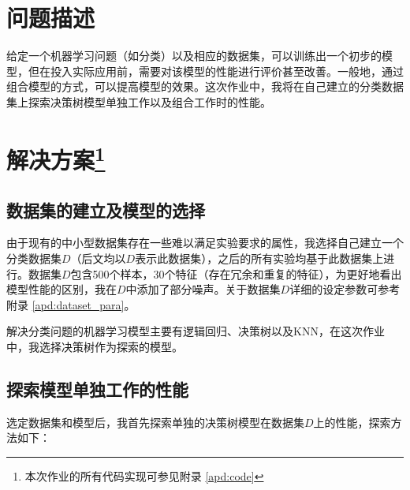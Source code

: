 \documentclass[12pt,a4paper]{article}
\theoremstyle{definition}
\begin{document}
\noindent
\noindent{}

\section{问题描述}

给定一个机器学习问题（如分类）以及相应的数据集，可以训练出一个初步的模型，但在投入实际应用前，需要对该模型的性能进行评价甚至改善。一般地，通过组合模型的方式，可以提高模型的效果。这次作业中，我将在自己建立的分类数据集上探索决策树模型单独工作以及组合工作时的性能。

\section{解决方案\protect\footnote{本次作业的所有代码实现可参见附录 \ref{apd:code}}}

\subsection{数据集的建立及模型的选择}

由于现有的中小型数据集存在一些难以满足实验要求的属性，我选择自己建立一个分类数据集$D$（后文均以$D$表示此数据集），之后的所有实验均基于此数据集上进行。数据集$D$包含500个样本，30个特征（存在冗余和重复的特征），为更好地看出模型性能的区别，我在$D$中添加了部分噪声。关于数据集$D$详细的设定参数可参考附录 \ref{apd:dataset_para}。

解决分类问题的机器学习模型主要有逻辑回归、决策树以及KNN，在这次作业中，我选择决策树作为探索的模型。

\subsection{探索模型单独工作的性能}

选定数据集和模型后，我首先探索单独的决策树模型在数据集$D$上的性能，探索方法如下：
\end{document}
